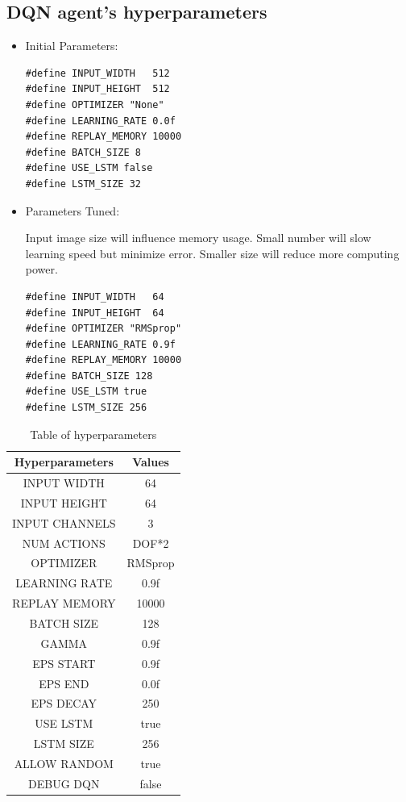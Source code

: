 \documentclass[10pt,journal,compsoc]{IEEEtran}
\begin{document}
\subsection{DQN agent's hyperparameters}
\begin{itemize}
\item Initial Parameters:
\begin{lstlisting}
#define INPUT_WIDTH   512
#define INPUT_HEIGHT  512
#define OPTIMIZER "None"
#define LEARNING_RATE 0.0f
#define REPLAY_MEMORY 10000
#define BATCH_SIZE 8
#define USE_LSTM false
#define LSTM_SIZE 32

\end{lstlisting}
\item Parameters Tuned:

Input image size will influence memory usage. Small number will slow learning speed but minimize error. Smaller size will reduce more computing power.
\begin{lstlisting}
#define INPUT_WIDTH   64 
#define INPUT_HEIGHT  64
#define OPTIMIZER "RMSprop" 
#define LEARNING_RATE 0.9f 
#define REPLAY_MEMORY 10000
#define BATCH_SIZE 128  
#define USE_LSTM true
#define LSTM_SIZE 256

\end{lstlisting}
\end {itemize}
\begin{table}[h]
 \begin{center}
      \begin{tabular}{ |c|c| } 
       \hline
       Hyperparameters & Values \\
       \hline
       INPUT WIDTH & 64 \\ 
       INPUT HEIGHT & 64 \\
       INPUT CHANNELS & 3\\
       NUM ACTIONS & DOF*2 \\
       OPTIMIZER & RMSprop \\
       LEARNING RATE & 0.9f\\
       REPLAY MEMORY & 10000 \\
       BATCH SIZE & 128\\
       GAMMA & 0.9f\\
       EPS START & 0.9f\\
       EPS END & 0.0f \\
       EPS DECAY & 250\\
       USE LSTM & true\\
       LSTM SIZE & 256\\
       ALLOW RANDOM & true\\
       DEBUG DQN & false \\
       \hline
      \end{tabular}
      \caption{Table of hyperparameters}
      \label{table:1}
      \end{center}
      \end{table}
\end{document}

